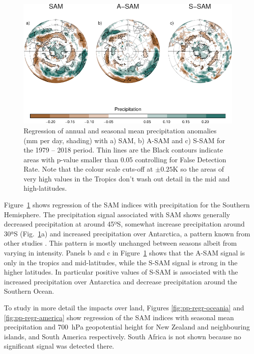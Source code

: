 \documentclass[smallextended]{svjour3}       %
\begin{document}
\begin{figure}
\includegraphics{global-pp-1} \caption{Regression of annual and seasonal mean precipitation anomalies (mm per day, shading) with a) SAM, b) A\nobreakdash-SAM and c) S\nobreakdash-SAM for the 1979 -- 2018 period. Thin lines are the Black contours indicate areas with p-value smaller than 0.05 controlling for False Detection Rate. Note that the colour scale cuts-off at \(\pm0.25 \mathrm{K}\) so the areas of very high values in the Tropics don't wash out detail in the mid and high-latitudes.}\label{fig:global-pp}
\end{figure}

Figure~\ref{fig:global-pp} shows regression of the SAM indices with precipitation for the Southern Hemisphere. The precipitation signal associated with SAM shows generally decreased precipitation at around 45ºS, somewhat increase precipitation around 30ªS (Fig.~\ref{fig:global-pp}a) and increased precipitation over Antarctica, a pattern known from other studies \citep[e.g.][]{hendon2014}.
This pattern is mostly unchanged between seasons albeit from varying in intensity.
Panels b and c in Figure~\ref{fig:global-pp} shows that the A\nobreakdash-SAM signal is only in the tropics and mid-latitudes, while the S\nobreakdash-SAM signal is strong in the higher latitudes.
In particular positive values of S\nobreakdash-SAM is associated with the increased precipitation over Antarctica and decrease precipitation around the Southern Ocean.

To study in more detail the impacts over land, Figures \ref{fig:pp-regr-oceania} and \ref{fig:pp-regr-america} show regression of the SAM indices with seasonal mean precipitation and 700~hPa geopotential height for New Zealand and neighbouring islands, and South America respectively.
South Africa is not shown because no significant signal was detected there.
\end{document}
